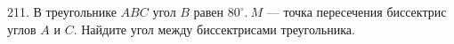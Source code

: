 211. В треугольнике $ABC$ угол $B$ равен $80^\circ.\ M$ --- точка пересечения биссектрис углов $A$ и $C.$
Найдите угол между биссектрисами треугольника.\\
